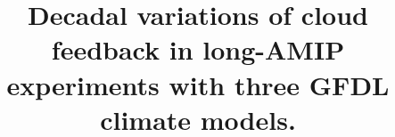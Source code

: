 \documentclass[grl]{agutex2015}
\begin{document}
%
%


\title{Decadal variations of cloud feedback in long-AMIP experiments with three GFDL climate models.}
%
%

%
%









%
%

\end{document}
